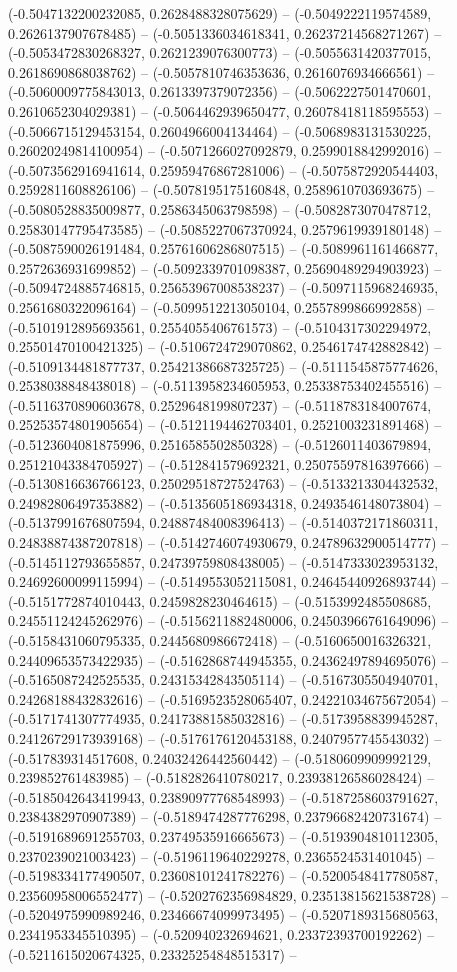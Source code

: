 (-0.5047132200232085, 0.2628488328075629) -- (-0.5049222119574589, 0.2626137907678485) -- (-0.5051336034618341, 0.26237214568271267) -- (-0.5053472830268327, 0.2621239076300773) -- (-0.5055631420377015, 0.2618690868038762) -- (-0.5057810746353636, 0.2616076934666561) -- (-0.5060009775843013, 0.2613397379072356) -- (-0.5062227501470601, 0.2610652304029381) -- (-0.5064462939650477, 0.26078418118595553) -- (-0.5066715129453154, 0.2604966004134464) -- (-0.5068983131530225, 0.26020249814100954) -- (-0.5071266027092879, 0.2599018842992016) -- (-0.5073562916941614, 0.25959476867281006) -- (-0.5075872920544403, 0.2592811608826106) -- (-0.5078195175160848, 0.2589610703693675) -- (-0.5080528835009877, 0.2586345063798598) -- (-0.5082873070478712, 0.25830147795473585) -- (-0.5085227067370924, 0.2579619939180148) -- (-0.5087590026191484, 0.25761606286807515) -- (-0.5089961161466877, 0.2572636931699852) -- (-0.5092339701098387, 0.25690489294903923) -- (-0.5094724885746815, 0.25653967008538237) -- (-0.5097115968246935, 0.2561680322096164) -- (-0.5099512213050104, 0.2557899866992858) -- (-0.5101912895693561, 0.2554055406761573) -- (-0.5104317302294972, 0.25501470100421325) -- (-0.5106724729070862, 0.2546174742882842) -- (-0.5109134481877737, 0.25421386687325725) -- (-0.5111545875774626, 0.2538038848438018) -- (-0.5113958234605953, 0.25338753402455516) -- (-0.5116370890603678, 0.2529648199807237) -- (-0.5118783184007674, 0.25253574801905654) -- (-0.5121194462703401, 0.2521003231891468) -- (-0.5123604081875996, 0.2516585502850328) -- (-0.5126011403679894, 0.25121043384705927) -- (-0.512841579692321, 0.25075597816397666) -- (-0.5130816636766123, 0.25029518727524763) -- (-0.5133213304432532, 0.24982806497353882) -- (-0.5135605186934318, 0.2493546148073804) -- (-0.5137991676807594, 0.24887484008396413) -- (-0.5140372171860311, 0.24838874387207818) -- (-0.5142746074930679, 0.24789632900514777) -- (-0.5145112793655857, 0.24739759808438005) -- (-0.5147333023953132, 0.24692600099115994) -- (-0.5149553052115081, 0.24645440926893744) -- (-0.5151772874010443, 0.2459828230464615) -- (-0.5153992485508685, 0.24551124245262976) -- (-0.5156211882480006, 0.24503966761649096) -- (-0.5158431060795335, 0.2445680986672418) -- (-0.5160650016326321, 0.24409653573422935) -- (-0.5162868744945355, 0.24362497894695076) -- (-0.5165087242525535, 0.24315342843505114) -- (-0.5167305504940701, 0.24268188432832616) -- (-0.5169523528065407, 0.24221034675672054) -- (-0.5171741307774935, 0.24173881585032816) -- (-0.5173958839945287, 0.24126729173939168) -- (-0.5176176120453188, 0.2407957745543032) -- (-0.517839314517608, 0.24032426442560442) -- (-0.5180609909992129, 0.239852761483985) -- (-0.5182826410780217, 0.23938126586028424) -- (-0.5185042643419943, 0.23890977768548993) -- (-0.5187258603791627, 0.2384382970907389) -- (-0.5189474287776298, 0.23796682420731674) -- (-0.5191689691255703, 0.23749535916665673) -- (-0.5193904810112305, 0.2370239021003423) -- (-0.5196119640229278, 0.2365524531401045) -- (-0.5198334177490507, 0.23608101241782276) -- (-0.5200548417780587, 0.23560958006552477) -- (-0.5202762356984829, 0.23513815621538728) -- (-0.5204975990989246, 0.23466674099973495) -- (-0.5207189315680563, 0.2341953345510395) -- (-0.520940232694621, 0.23372393700192262) -- (-0.5211615020674325, 0.23325254848515317) -- 